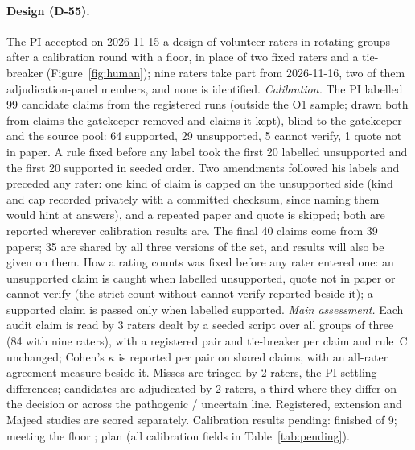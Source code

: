 \documentclass{article} %
\begin{document}
\paragraph{Design (D-55).} The PI accepted on 2026-11-15 a design of volunteer raters in rotating groups after a calibration round with a floor, in place of two fixed raters and a tie-breaker (Figure~\ref{fig:human}); nine raters take part from 2026-11-16, two of them adjudication-panel members, and none is identified. \emph{Calibration.} The PI labelled 99 candidate claims from the registered runs (outside the O1 sample; drawn both from claims the gatekeeper removed and claims it kept), blind to the gatekeeper and the source pool: 64 supported, 29 unsupported, 5 cannot verify, 1 quote not in paper. A rule fixed before any label took the first 20 labelled unsupported and the first 20 supported in seeded order. Two amendments followed his labels and preceded any rater: one kind of claim is capped on the unsupported side (kind and cap recorded privately with a committed checksum, since naming them would hint at answers), and a repeated paper and quote is skipped; both are reported wherever calibration results are. The final 40 claims come from 39 papers; 35 are shared by all three versions of the set, and results will also be given on them. How a rating counts was fixed before any rater entered one: an unsupported claim is caught when labelled unsupported, quote not in paper or cannot verify (the strict count without cannot verify reported beside it); a supported claim is passed only when labelled supported. \emph{Main assessment.} Each audit claim is read by 3 raters dealt by a seeded script over all groups of three (84 with nine raters), with a registered pair and tie-breaker per claim and rule~C unchanged; Cohen's $\kappa$ is reported per pair on shared claims, with an all-rater agreement measure beside it. Misses are triaged by 2 raters, the PI settling differences; candidates are adjudicated by 2 raters, a third where they differ on the decision or across the pathogenic / uncertain line. Registered, extension and Majeed studies are scored separately. Calibration results pending: finished  of 9; meeting the floor ; plan  (all calibration fields in Table~\ref{tab:pending}).
\end{document}
